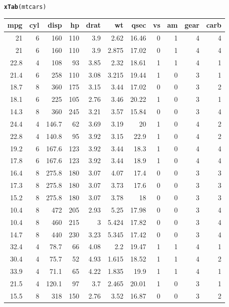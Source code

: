 \documentclass{article}\usepackage[]{graphicx}\usepackage[]{color}
\newcommand{\hlstd}[1]{\textcolor[rgb]{0.345,0.345,0.345}{#1}}%
\newcommand{\hlkwd}[1]{\textcolor[rgb]{0.737,0.353,0.396}{\textbf{#1}}}%
\begin{document}
\begin{alltt}
\hlkwd{xTab}\hlstd{(mtcars)}
\end{alltt}
\begin{table}[ht]
\begin{center}
\begin{tabular}{rrrrrrrrrrr}
\hline
mpg & cyl & disp & hp & drat & wt & qsec & vs & am & gear & carb \\
\hline
21 & 6 & 160 & 110 & 3.9 & 2.62 & 16.46 & 0 & 1 & 4 & 4 \\
21 & 6 & 160 & 110 & 3.9 & 2.875 & 17.02 & 0 & 1 & 4 & 4 \\
22.8 & 4 & 108 & 93 & 3.85 & 2.32 & 18.61 & 1 & 1 & 4 & 1 \\
21.4 & 6 & 258 & 110 & 3.08 & 3.215 & 19.44 & 1 & 0 & 3 & 1 \\
18.7 & 8 & 360 & 175 & 3.15 & 3.44 & 17.02 & 0 & 0 & 3 & 2 \\
18.1 & 6 & 225 & 105 & 2.76 & 3.46 & 20.22 & 1 & 0 & 3 & 1 \\
14.3 & 8 & 360 & 245 & 3.21 & 3.57 & 15.84 & 0 & 0 & 3 & 4 \\
24.4 & 4 & 146.7 & 62 & 3.69 & 3.19 & 20 & 1 & 0 & 4 & 2 \\
22.8 & 4 & 140.8 & 95 & 3.92 & 3.15 & 22.9 & 1 & 0 & 4 & 2 \\
19.2 & 6 & 167.6 & 123 & 3.92 & 3.44 & 18.3 & 1 & 0 & 4 & 4 \\
17.8 & 6 & 167.6 & 123 & 3.92 & 3.44 & 18.9 & 1 & 0 & 4 & 4 \\
16.4 & 8 & 275.8 & 180 & 3.07 & 4.07 & 17.4 & 0 & 0 & 3 & 3 \\
17.3 & 8 & 275.8 & 180 & 3.07 & 3.73 & 17.6 & 0 & 0 & 3 & 3 \\
15.2 & 8 & 275.8 & 180 & 3.07 & 3.78 & 18 & 0 & 0 & 3 & 3 \\
10.4 & 8 & 472 & 205 & 2.93 & 5.25 & 17.98 & 0 & 0 & 3 & 4 \\
10.4 & 8 & 460 & 215 & 3 & 5.424 & 17.82 & 0 & 0 & 3 & 4 \\
14.7 & 8 & 440 & 230 & 3.23 & 5.345 & 17.42 & 0 & 0 & 3 & 4 \\
32.4 & 4 & 78.7 & 66 & 4.08 & 2.2 & 19.47 & 1 & 1 & 4 & 1 \\
30.4 & 4 & 75.7 & 52 & 4.93 & 1.615 & 18.52 & 1 & 1 & 4 & 2 \\
33.9 & 4 & 71.1 & 65 & 4.22 & 1.835 & 19.9 & 1 & 1 & 4 & 1 \\
21.5 & 4 & 120.1 & 97 & 3.7 & 2.465 & 20.01 & 1 & 0 & 3 & 1 \\
15.5 & 8 & 318 & 150 & 2.76 & 3.52 & 16.87 & 0 & 0 & 3 & 2 \\

\end{tabular}
\end{center}
\end{table}
\end{document}

